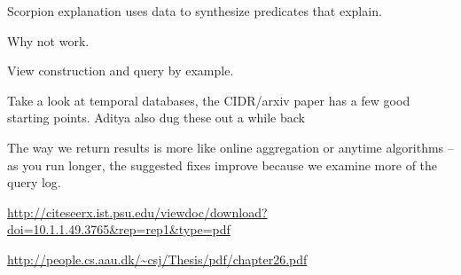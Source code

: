 \cite{mucslu2013data}



Scorpion explanation uses data to synthesize predicates that explain.

Why not work.

View construction and query by example.

Take a look at temporal databases, the CIDR/arxiv paper has a few good starting points. Aditya also dug these out a while back


The way we return results is more like online aggregation or anytime algorithms -- 
as you run longer, the suggested fixes improve because we examine more of the query log.

\url{http://citeseerx.ist.psu.edu/viewdoc/download?doi=10.1.1.49.3765&rep=rep1&type=pdf}

\url{http://people.cs.aau.dk/~csj/Thesis/pdf/chapter26.pdf}
